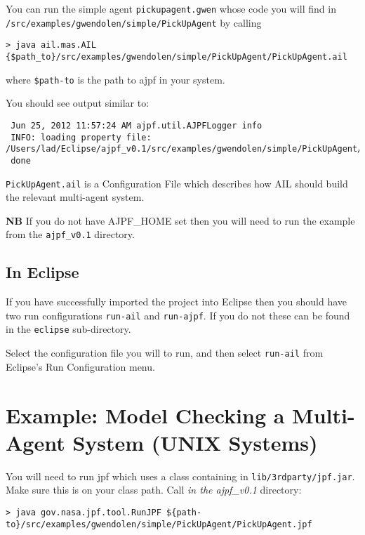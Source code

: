 You can run the simple agent \texttt{pickupagent.gwen} whose code you will find in \texttt{/src/examples/gwendolen/simple/PickUpAgent} by calling

\noindent \begin{lstlisting}[basicstyle=\tiny]
> java ail.mas.AIL {$path_to}/src/examples/gwendolen/simple/PickUpAgent/PickUpAgent.ail
\end{lstlisting}
\medskip

\noindent where \texttt{\${path-to}} is the path to ajpf in your system.

You should see output similar to:

\noindent \begin{lstlisting}
 Jun 25, 2012 11:57:24 AM ajpf.util.AJPFLogger info
 INFO: loading property file: /Users/lad/Eclipse/ajpf_v0.1/src/examples/gwendolen/simple/PickUpAgent/PickUpAgent.ail
 done
\end{lstlisting}
\medskip
 
\texttt{PickUpAgent.ail} is a Configuration File which describes how AIL should build the relevant multi-agent system.

{\bf NB}  If you do not have AJPF\_HOME set then you will need to run the example from the \texttt{ajpf\_v0.1} directory.

\subsection{In Eclipse}

If you have successfully imported the project into Eclipse then you should have two run configurations \texttt{run-ail} and \texttt{run-ajpf}.  If you do not these can be found in the \texttt{eclipse} sub-directory.

Select the configuration file you will to run, and then select \texttt{run-ail} from Eclipse's Run Configuration menu.


\section{Example: Model Checking a Multi-Agent System (UNIX Systems)}

You will need to run jpf which uses a class containing in \texttt{lib/3rdparty/jpf.jar}.  Make sure this is on your class path.  Call \emph{in the ajpf\_v0.1} directory:

\noindent \begin{lstlisting}[basicstyle=\tiny]
> java gov.nasa.jpf.tool.RunJPF ${path-to}/src/examples/gwendolen/simple/PickUpAgent/PickUpAgent.jpf
\end{lstlisting}
\medskip

